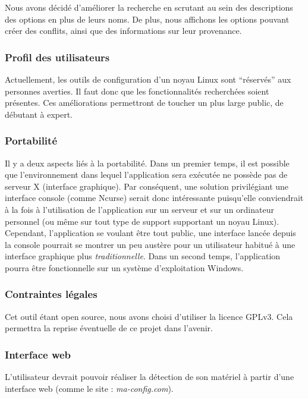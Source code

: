 \documentclass[17pts]{report}
\begin{document}
Nous avons décidé d’améliorer la recherche en scrutant au sein des descriptions
des options en plus de leurs noms. De plus, nous affichons les options pouvant
créer des conflits, ainsi que des informations sur leur provenance.

\subsubsection{Profil des utilisateurs}
\label{ssub:Profil des utilisateurs}
Actuellement, les outils de configuration d’un noyau Linux sont “réservés” aux
personnes averties. Il faut donc que les fonctionnalités recherchées soient
présentes. Ces améliorations permettront de toucher un plus large public, de
débutant à expert.

\subsubsection{Portabilité}
\label{ssub:Portabilité}
Il y a deux aspects liés à la portabilité. Dans un premier temps, il est
possible que l’environnement dans lequel l’application sera exécutée ne possède
pas de serveur X (interface graphique). Par conséquent, une solution
privilégiant une interface console (comme Ncurse) serait donc intéressante
puisqu’elle conviendrait à la fois à l’utilisation de l’application sur un
serveur et sur un ordinateur personnel (ou même sur tout type de support
supportant un noyau Linux). Cependant, l’application se voulant être tout
public, une interface lancée depuis la console pourrait se montrer un peu
austère pour un utilisateur habitué à une interface graphique plus
\textit{traditionnelle}.  Dans un second temps, l’application pourra être
fonctionnelle sur un système d’exploitation Windows.

\subsubsection{Contraintes légales}
\label{ssub:Contraintes légales}
Cet outil étant open source, nous avons choisi d’utiliser la licence GPLv3.
Cela permettra la reprise éventuelle de ce projet dans l’avenir.

\subsubsection{Interface web}
\label{ssub:Interface web}
L’utilisateur devrait pouvoir réaliser la détection de son matériel à partir
d’une interface web (comme le site : \textit{ma-config.com}).
\end{document}
